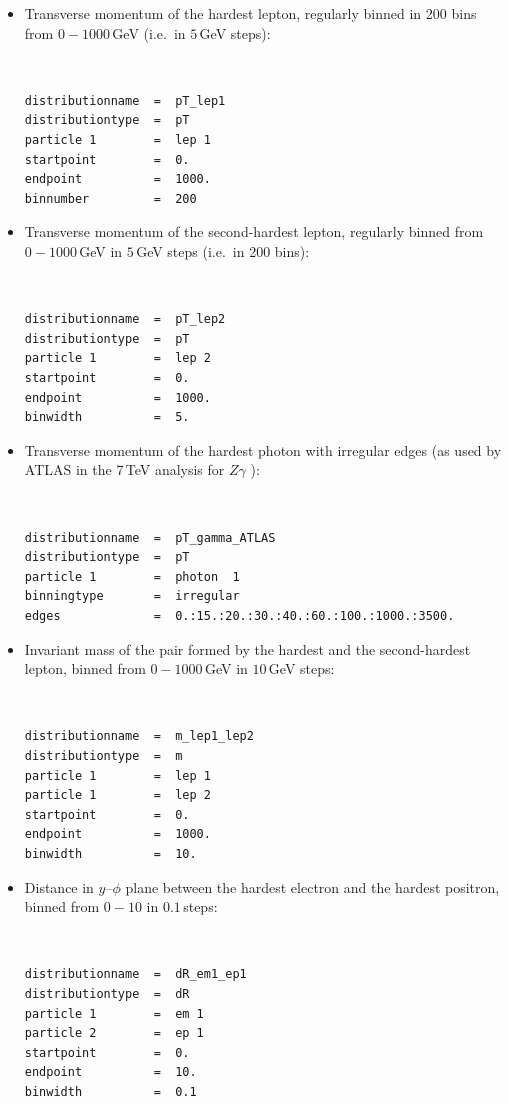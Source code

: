 \documentclass[english,11pt]{article}
\begin{document}
\begin{itemize}
\item Transverse momentum of the hardest lepton, regularly binned in 200 bins from $0-1000$\,GeV (i.e.\ in $5$\,GeV steps):
\lstset{basicstyle=\scriptsize, frame=single}
{\tt
\begin{lstlisting}
distributionname  =  pT_lep1
distributiontype  =  pT
particle 1        =  lep 1
startpoint        =  0.
endpoint          =  1000.
binnumber         =  200 
\end{lstlisting}
}
\item Transverse momentum of the second-hardest lepton, regularly binned from $0-1000$\,GeV in $5$\,GeV steps (i.e.\ in 200 bins):
\lstset{basicstyle=\scriptsize, frame=single}
{\tt
\begin{lstlisting}
distributionname  =  pT_lep2
distributiontype  =  pT
particle 1        =  lep 2
startpoint        =  0.
endpoint          =  1000.
binwidth          =  5. 
\end{lstlisting}
}
\item Transverse momentum of the hardest photon with irregular edges (as used by ATLAS in the 7\,TeV analysis for $Z\gamma$ \cite{Aad:2013izg}):
\lstset{basicstyle=\scriptsize, frame=single}
{\tt
\begin{lstlisting}
distributionname  =  pT_gamma_ATLAS
distributiontype  =  pT
particle 1        =  photon  1
binningtype       =  irregular
edges             =  0.:15.:20.:30.:40.:60.:100.:1000.:3500.
\end{lstlisting}
}
\item Invariant mass of the pair formed by the hardest and the second-hardest lepton, binned from $0-1000$\,GeV in $10$\,GeV steps:
\lstset{basicstyle=\scriptsize, frame=single}
{\tt
\begin{lstlisting}
distributionname  =  m_lep1_lep2
distributiontype  =  m
particle 1        =  lep 1
particle 1        =  lep 2
startpoint        =  0.
endpoint          =  1000.
binwidth          =  10.
\end{lstlisting}
}
\item Distance in $y$--$\phi$ plane between the hardest electron and the hardest positron, binned from $0-10$ in $0.1$\,steps:
\lstset{basicstyle=\scriptsize, frame=single}
{\tt
\begin{lstlisting}
distributionname  =  dR_em1_ep1
distributiontype  =  dR
particle 1        =  em 1
particle 2        =  ep 1
startpoint        =  0.
endpoint          =  10.
binwidth          =  0.1
\end{lstlisting}
}

\end{itemize}
\end{document}
